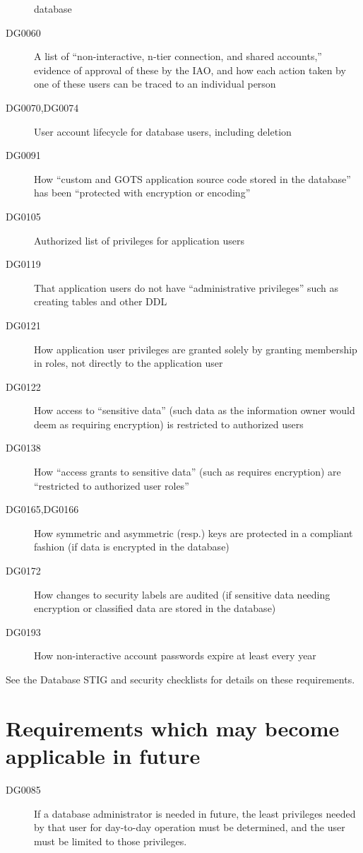 \begin{description}
database
\item[DG0060] A list of ``non-interactive, n-tier connection, and shared
accounts,'' evidence of approval of these by the IAO, and how each action
taken by one of these users can be traced to an individual person
\item[DG0070,DG0074] User account lifecycle for database users, including
deletion
\item[DG0091] How ``custom and GOTS application source code stored in the
database'' has been ``protected with encryption or encoding''
\item[DG0105] Authorized list of privileges for application users
\item[DG0119] That application users do not have ``administrative
privileges'' such as creating tables and other DDL
\item[DG0121] How application user privileges are granted solely by
granting membership in roles, not directly to the application user
\item[DG0122] How access to ``sensitive data'' (such data as the
information owner would deem as requiring encryption) is restricted to
authorized users
\item[DG0138] How ``access grants to sensitive data'' (such as requires
encryption) are ``restricted to authorized user roles''
\item[DG0165,DG0166] How symmetric and asymmetric (resp.) keys are
protected in a compliant fashion (if data is encrypted in the database)
\item[DG0172] How changes to security labels are audited (if sensitive
data needing encryption or classified data are stored in the database)
\item[DG0193] How non-interactive account passwords expire at least every
year
%
\end{description}


See the Database STIG and security checklists for details on these
requirements.





\section{Requirements which may become applicable in future}
\label{DatabaseFutureRequirements}

\begin{description}
\item[DG0085] If a database administrator is needed in future, the
least privileges needed by that user for day-to-day operation must be
determined, and the user must be limited to those privileges.
\end{description}

